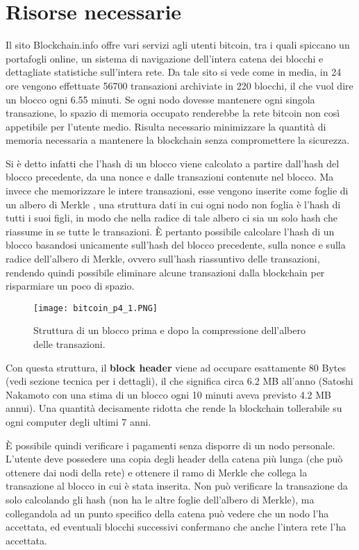 \section{Risorse necessarie}\label{risorse-necessarie}

Il sito Blockchain.info \cite{blockchain-info} offre vari servizi agli utenti bitcoin, tra i quali spiccano un portafogli online, un sistema di navigazione dell'intera catena dei blocchi e dettagliate statistiche sull'intera rete. Da tale sito si vede come in media, in 24 ore vengono effettuate 56700 transazioni archiviate in 220 blocchi, il che vuol dire un blocco ogni 6.55 minuti. Se ogni nodo dovesse mantenere ogni singola transazione, lo spazio di memoria occupato renderebbe la rete bitcoin non così appetibile per l'utente medio. Risulta necessario minimizzare la quantità di memoria necessaria a mantenere la blockchain senza compromettere la sicurezza.

Si è detto infatti che l'hash di un blocco viene calcolato a partire dall'hash del blocco precedente, da una nonce e dalle transazioni contenute nel blocco. Ma invece che memorizzare le intere transazioni, esse vengono inserite come foglie di un albero di Merkle \cite{merkle}, una struttura dati in cui ogni nodo non foglia è l'hash di tutti i suoi figli, in modo che nella radice di tale albero ci sia un solo hash che riassume in se tutte le transazioni. È pertanto possibile calcolare l'hash di un blocco basandosi unicamente sull'hash del blocco precedente, sulla nonce e sulla radice dell'albero di Merkle, ovvero sull'hash riassuntivo delle transazioni, rendendo quindi possibile eliminare alcune transazioni dalla blockchain per risparmiare un poco di spazio.

\begin{figure}[htbp]
\centering
\texttt{[image: bitcoin\_p4\_1.PNG]}
\caption{Struttura di un blocco prima e dopo la compressione dell'albero delle transazioni.\label{bitcoin_p4_1}}
\end{figure}

Con questa struttura, il \textbf{block header} viene ad occupare esattamente 80 Bytes (vedi sezione tecnica per i dettagli), il che significa circa 6.2 MB all'anno (Satoshi Nakamoto con una stima di un blocco ogni 10 minuti aveva previsto 4.2 MB annui). Una quantità decisamente ridotta che rende la blockchain tollerabile su ogni computer degli ultimi 7 anni.

È possibile quindi verificare i pagamenti senza disporre di un nodo personale. L'utente deve possedere una copia degli header della catena più lunga (che può ottenere dai nodi della rete) e ottenere il ramo di Merkle che collega la transazione al blocco in cui è stata inserita. Non può verificare la transazione da solo calcolando gli hash (non ha le altre foglie dell'albero di Merkle), ma collegandola ad un punto specifico della catena può vedere che un nodo l'ha accettata, ed eventuali blocchi successivi confermano che anche l'intera rete l'ha accettata.

